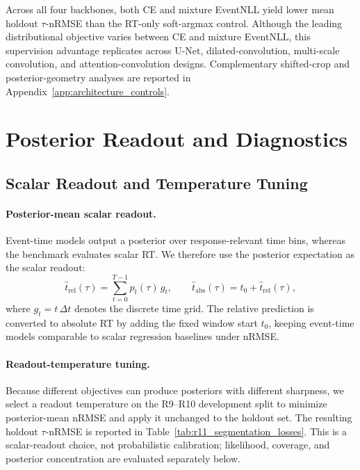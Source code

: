 \documentclass[12pt]{article}
\begin{document}
Across all four backbones, both CE and mixture EventNLL yield lower mean
holdout $\tau$-nRMSE than the RT-only soft-argmax control. Although the leading
distributional objective varies between CE and mixture EventNLL, this
supervision advantage replicates across U-Net, dilated-convolution,
multi-scale convolution, and attention-convolution designs. Complementary
shifted-crop and posterior-geometry analyses are reported in
Appendix~\ref{app:architecture_controls}.
\FloatBarrier

\section{Posterior Readout and Diagnostics}
\label{sec:posterior_diagnostics}

\subsection{Scalar Readout and Temperature Tuning}

\paragraph{Posterior-mean scalar readout.}
Event-time models output a posterior over response-relevant time bins, whereas the benchmark evaluates scalar RT. We therefore use the posterior expectation as the scalar readout:
\begin{equation}
\label{eq:rt_soft_argmax}
\hat t_{\mathrm{rel}}(\tau)=\sum_{t=0}^{T-1} p_t(\tau)\, g_t,
\qquad
\hat t_{\mathrm{abs}}(\tau)=t_0+\hat t_{\mathrm{rel}}(\tau),
\end{equation}
where $g_t=t\,\Delta t$ denotes the discrete time grid. The relative prediction is converted to absolute RT by adding the fixed window start $t_0$, keeping event-time models comparable to scalar regression baselines under nRMSE.

\paragraph{Readout-temperature tuning.}
Because different objectives can produce posteriors with different sharpness, we select a readout temperature on the R9--R10 development split to minimize posterior-mean nRMSE and apply it unchanged to the holdout set. The resulting holdout \(\tau\)-nRMSE is reported in Table~\ref{tab:r11_segmentation_losses}. This is a scalar-readout choice, not probabilistic calibration; likelihood, coverage, and posterior concentration are evaluated separately below.
\end{document}

